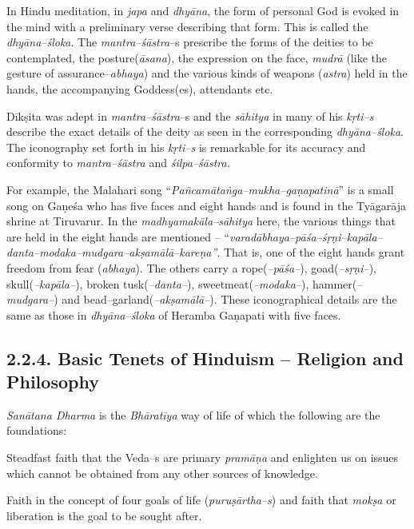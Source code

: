 In Hindu meditation, in \textit{japa} and \textit{dhyāna}, the form of personal God is evoked in the mind with a preliminary verse describing that form. This is called the \textit{dhyāna–śloka}. The \textit{mantra–śāstra}–s prescribe the forms of the deities to be contemplated, the posture(\textit{āsana}), the expression on the face, \textit{mudrā} (like the gesture of assurance–\textit{abhaya}) and the various kinds of weapons (\textit{astra}) held in the hands, the accompanying Goddess(es), attendants etc.

Dīkṣita was adept in \textit{mantra–śāstra}–s and the \textit{sāhitya} in many of his \textit{kṛti–s} describe the exact details of the deity as seen in the corresponding \textit{dhyāna–śloka}. The iconography set forth in his \textit{kṛti–s} is remarkable for its accuracy and conformity to \textit{mantra–śāstra} and \textit{śilpa–śāstra.}

\item For example, the Malahari song “\textit{Pañcamātaṅga–mukha–gaṇapatinā}” is a small song on Gaṇeśa who has five faces and eight hands and is found in the Tyāgarāja shrine at Tiruvarur. In the \textit{madhyamakāla–sāhitya} here, the various things that are held in the eight hands are mentioned – “\textit{varadābhaya–pāśa–śṛṇi–kapāla–danta–modaka–mudgara–akṣamālā–kareṇa”}. That is, one of the eight hands grant freedom from fear (\textit{abhaya}). The others carry a rope(\textit{–pāśa–}), goad(\textit{–sṛṇi–}), skull(\textit{–kapāla–}), broken tusk(\textit{–danta–}), sweetmeat(\textit{–modaka–}), hammer(\textit{–mudgara–}) and bead–garland(\textit{–akṣamālā–}). These iconographical details are the same as those in \textit{dhyāna–śloka} of Heramba Gaṇapati with five faces.



\subsection*{2.2.4. Basic Tenets of Hinduism – Religion and Philosophy}

\textit{Sanātana Dharma} is the \textit{Bhāratīya} way of life of which the following are the foundations:

\item Steadfast faith that the Veda–s are primary \textit{pramāṇa} and enlighten us on issues which cannot be obtained from any other sources of knowledge.

 \item Faith in the concept of four goals of life (\textit{puruṣārtha–s}) and faith that \textit{mokṣa} or liberation is the goal to be sought after.

